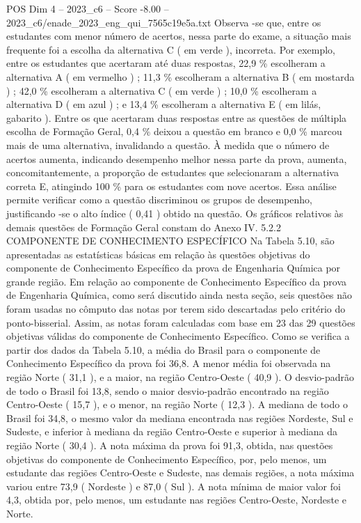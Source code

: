 \begin{textsample}{POS Dim 4 – 2023\_c6 – Score -8.00 – 2023\_c6/enade\_2023\_eng\_qui\_7565c19e5a.txt}
Observa -se que, entre os estudantes com menor número de acertos, nessa parte do exame, a situação mais frequente foi a escolha da alternativa C ( em verde ), incorreta.
Por exemplo, entre os estudantes que acertaram até duas respostas, 22,9 \% escolheram a alternativa A ( em vermelho ) ; 11,3 \% escolheram a alternativa B ( em mostarda ) ; 42,0 \% escolheram a alternativa C ( em verde ) ; 10,0 \% escolheram a alternativa D ( em azul ) ; e 13,4 \% escolheram a alternativa E ( em lilás, gabarito ).
Entre os que acertaram duas respostas entre as questões de múltipla escolha de Formação Geral, 0,4 \% deixou a questão em branco e 0,0 \% marcou mais de uma alternativa, invalidando a questão.
À medida que o número de acertos aumenta, indicando desempenho melhor nessa parte da prova, aumenta, concomitantemente, a proporção de estudantes que selecionaram a alternativa correta E, atingindo 100 \% para os estudantes com nove acertos.
Essa análise permite verificar como a questão discriminou os grupos de desempenho, justificando -se o alto índice ( 0,41 ) obtido na questão.
Os gráficos relativos às demais questões de Formação Geral constam do Anexo IV. 5.2.2 COMPONENTE DE CONHECIMENTO ESPECÍFICO Na Tabela 5.10, são apresentadas as estatísticas básicas em relação às questões objetivas do componente de Conhecimento Específico da prova de Engenharia Química por grande região.
Em relação ao componente de Conhecimento Específico da prova de Engenharia Química, como será discutido ainda nesta seção, seis questões não foram usadas no cômputo das notas por terem sido descartadas pelo critério do ponto-bisserial.
Assim, as notas foram calculadas com base em 23 das 29 questões objetivas válidas do componente de Conhecimento Específico.
Como se verifica a partir dos dados da Tabela 5.10, a média do Brasil para o componente de Conhecimento Específico da prova foi 36,8.
A menor média foi observada na região Norte ( 31,1 ), e a maior, na região Centro-Oeste ( 40,9 ).
O desvio-padrão de todo o Brasil foi 13,8, sendo o maior desvio-padrão encontrado na região Centro-Oeste ( 15,7 ), e o menor, na região Norte ( 12,3 ).
A mediana de todo o Brasil foi 34,8, o mesmo valor da mediana encontrada nas regiões Nordeste, Sul e Sudeste, e inferior à mediana da região Centro-Oeste e superior à mediana da região Norte ( 30,4 ).
A nota máxima da prova foi 91,3, obtida, nas questões objetivas do componente de Conhecimento Específico, por, pelo menos, um estudante das regiões Centro-Oeste e Sudeste, nas demais regiões, a nota máxima variou entre 73,9 ( Nordeste ) e 87,0 ( Sul ).
A nota mínima de maior valor foi 4,3, obtida por, pelo menos, um estudante nas regiões Centro-Oeste, Nordeste e Norte.

\end{textsample}
